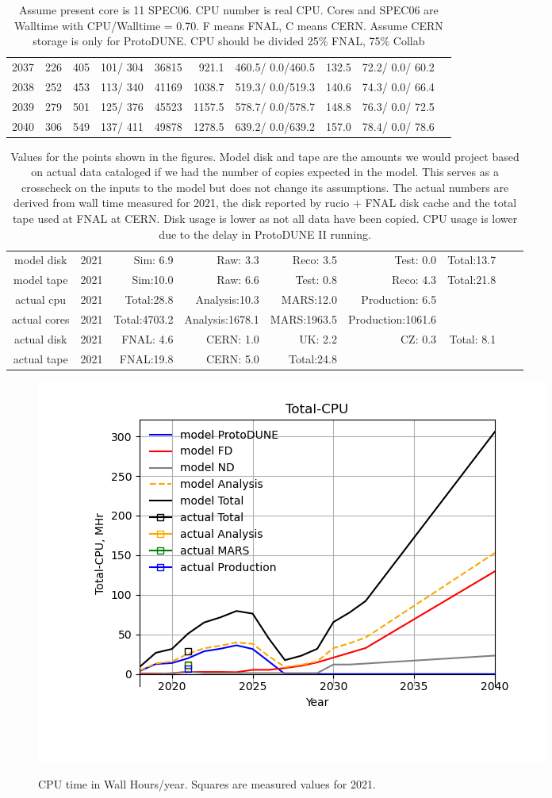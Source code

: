 \documentclass[12pt]{article}
\begin{document}
\begin{table}
\begin{tabular}[h]{crrrrrcccc}
2037&	 226&	 405&	 101/ 304&	 36815&	    921.1&	 460.5/  0.0/460.5&	    132.5&	  72.2/  0.0/ 60.2\\
2038&	 252&	 453&	 113/ 340&	 41169&	   1038.7&	 519.3/  0.0/519.3&	    140.6&	  74.3/  0.0/ 66.4\\
2039&	 279&	 501&	 125/ 376&	 45523&	   1157.5&	 578.7/  0.0/578.7&	    148.8&	  76.3/  0.0/ 72.5\\
2040&	 306&	 549&	 137/ 411&	 49878&	   1278.5&	 639.2/  0.0/639.2&	    157.0&	  78.4/  0.0/ 78.6\\
\end{tabular}
\caption{Assume present core is   11 SPEC06. CPU number is real CPU. Cores and SPEC06 are Walltime with CPU/Walltime =  0.70.  F means FNAL, C means CERN. Assume CERN storage is only  for ProtoDUNE. CPU should be divided 25\% FNAL, 75\% Collab}\normalsize
 \end{table}
\begin{table}
\footnotesize
 \centering \begin{tabular}[h]{crrrrrrrr}
          model disk&2021&Sim: 6.9&Raw: 3.3&Reco: 3.5&Test: 0.0&Total:13.7\\
          model tape&2021&Sim:10.0&Raw: 6.6&Test: 0.8&Reco: 4.3&Total:21.8\\
          actual cpu&2021&Total:28.8&Analysis:10.3&MARS:12.0&Production: 6.5\\
        actual cores&2021&Total:4703.2&Analysis:1678.1&MARS:1963.5&Production:1061.6\\
         actual disk&2021&FNAL: 4.6&CERN: 1.0&UK: 2.2&CZ: 0.3&Total: 8.1\\
         actual tape&2021&FNAL:19.8&CERN: 5.0&Total:24.8\\
\end{tabular}
\caption{Values for the points shown in the figures. Model disk and tape are the amounts we would project based on actual data cataloged if we had the number of copies expected in the model. This serves as a crosscheck on the inputs to the model but does not change its assumptions.  The actual numbers are derived from wall time measured for 2021, the disk reported by rucio + FNAL disk cache and the total tape used at FNAL at CERN. Disk usage is lower as not all data have been copied. CPU usage is lower due to the delay in ProtoDUNE II running.}\normalsize
 \end{table}
\pagebreak\begin{figure}[h]
\centering\includegraphics[height=0.4\textwidth]{Parameters_2022-03-04-2040-Total-CPU.png}\label{TotalCPU}
\caption{CPU time in Wall Hours/year. Squares are measured values for 2021.}
\end{figure}
\end{document}
